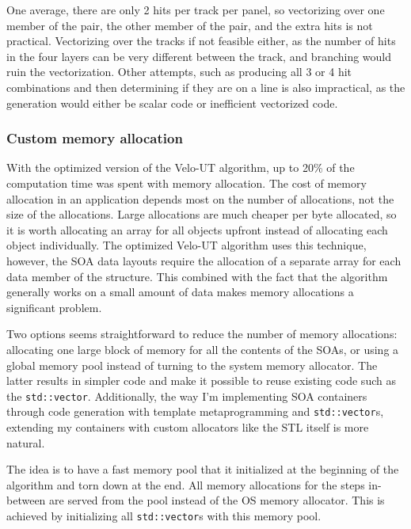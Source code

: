\documentclass[12pt]{article}
\newcommand{\code}[1]{\texttt{#1}}
\begin{document}
One average, there are only 2 hits per track per panel, so vectorizing over one member of the pair, the other member of the pair, and the extra hits is not practical. Vectorizing over the tracks if not feasible either, as the number of hits in the four layers can be very different between the track, and branching would ruin the vectorization. Other attempts, such as producing all 3 or 4 hit combinations and then determining if they are on a line is also impractical, as the generation would either be scalar code or inefficient vectorized code.


\subsubsection{Custom memory allocation} \label{sec_velout_stack_alloc}

With the optimized version of the Velo-UT algorithm, up to 20\% of the computation time was spent with memory allocation. The cost of memory allocation in an application depends most on the number of allocations, not the size of the allocations. Large allocations are much cheaper per byte allocated, so it is worth allocating an array for all objects upfront instead of allocating each object individually. The optimized Velo-UT algorithm uses this technique, however, the SOA data layouts require the allocation of a separate array for each data member of the structure. This combined with the fact that the algorithm generally works on a small amount of data makes memory allocations a significant problem.

\vspace{1pc}

Two options seems straightforward to reduce the number of memory allocations: allocating one large block of memory for all the contents of the SOAs, or using a global memory pool instead of turning to the system memory allocator. The latter results in simpler code and make it possible to reuse existing code such as the \code{std::vector}. Additionally, the way I'm implementing SOA containers through code generation with template metaprogramming and \code{std::vector}s, extending my containers with custom allocators like the STL itself is more natural.

\vspace{1pc}

The idea is to have a fast memory pool that it initialized at the beginning of the algorithm and torn down at the end. All memory allocations for the steps in-between are served from the pool instead of the OS memory allocator. This is achieved by initializing all \code{std::vector}s with this memory pool.
\end{document}

